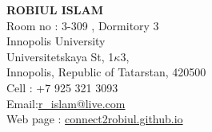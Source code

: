\documentclass[letterpaper,10pt]{article}
\begin{document}
\textbf{ROBIUL ISLAM }  \\
Room no : 3-309 , Dormitory 3 \\ 
Innopolis University \\ 
Universitetskaya St, 1$\kappa$3, \\
Innopolis, Republic of Tatarstan, 420500 \\
Cell : +7 925 321 3093 \\
Email:\href{mailto:r\_islam@live.com}{r\_islam@live.com} \\
Web page : \url{connect2robiul.github.io}


\end{document}

